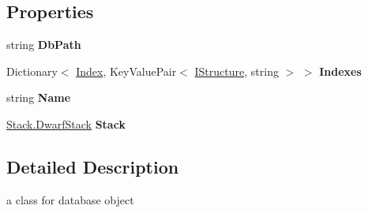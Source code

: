 \subsection*{Properties}
\begin{DoxyCompactItemize}
\item 
\hypertarget{class_dwarf_d_b_1_1_data_structures_1_1_data_base_a6d2cec1036e84cf7bd32e14cb57fb2c9}{
string {\bfseries DbPath}}
\label{class_dwarf_d_b_1_1_data_structures_1_1_data_base_a6d2cec1036e84cf7bd32e14cb57fb2c9}

\item 
\hypertarget{class_dwarf_d_b_1_1_data_structures_1_1_data_base_a17e9d903646d5709103eabea2113c974}{
Dictionary$<$ \hyperlink{class_dwarf_d_b_1_1_data_structures_1_1_index}{Index}, KeyValuePair$<$ \hyperlink{interface_dwarf_d_b_1_1_data_structures_1_1_i_structure}{IStructure}, string $>$ $>$ {\bfseries Indexes}}
\label{class_dwarf_d_b_1_1_data_structures_1_1_data_base_a17e9d903646d5709103eabea2113c974}

\item 
\hypertarget{class_dwarf_d_b_1_1_data_structures_1_1_data_base_ab8b85389f822faa790eaf18a7fe35cce}{
string {\bfseries Name}}
\label{class_dwarf_d_b_1_1_data_structures_1_1_data_base_ab8b85389f822faa790eaf18a7fe35cce}

\item 
\hypertarget{class_dwarf_d_b_1_1_data_structures_1_1_data_base_a2ca4a32633cc1324190d6f37da17cc8b}{
\hyperlink{class_dwarf_d_b_1_1_stack_1_1_dwarf_stack}{Stack.DwarfStack} {\bfseries Stack}}
\label{class_dwarf_d_b_1_1_data_structures_1_1_data_base_a2ca4a32633cc1324190d6f37da17cc8b}

\end{DoxyCompactItemize}


\subsection{Detailed Description}
a class for database object 

